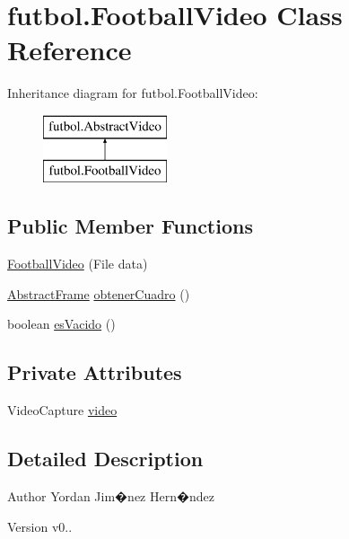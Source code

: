 \hypertarget{classfutbol_1_1_football_video}{}\section{futbol.\+Football\+Video Class Reference}
\label{classfutbol_1_1_football_video}
Inheritance diagram for futbol.\+Football\+Video\+:\begin{figure}[H]
\begin{center}
\leavevmode
\includegraphics[height=2.000000cm]{classfutbol_1_1_football_video}
\end{center}
\end{figure}
\subsection*{Public Member Functions}
\begin{DoxyCompactItemize}
\item 
\hyperlink{classfutbol_1_1_football_video_a89741e0d173c2aa8640b6a7d237f85cc}{Football\+Video} (File data)
\item 
\hyperlink{classfutbol_1_1_abstract_frame}{Abstract\+Frame} \hyperlink{classfutbol_1_1_football_video_ac304b913823a5a41123958aea7618098}{obtener\+Cuadro} ()
\item 
boolean \hyperlink{classfutbol_1_1_football_video_a05d954e93f7526b037ce5d88c672540b}{es\+Vacido} ()
\end{DoxyCompactItemize}
\subsection*{Private Attributes}
\begin{DoxyCompactItemize}
\item 
Video\+Capture \hyperlink{classfutbol_1_1_football_video_aee6e3af1ca6ab8dc215032f0f8c92ba1}{video}
\end{DoxyCompactItemize}


\subsection{Detailed Description}
\begin{DoxyAuthor}{Author}
Yordan Jim�nez Hern�ndez 
\end{DoxyAuthor}
\begin{DoxyVersion}{Version}
v0.. 
\end{DoxyVersion}


